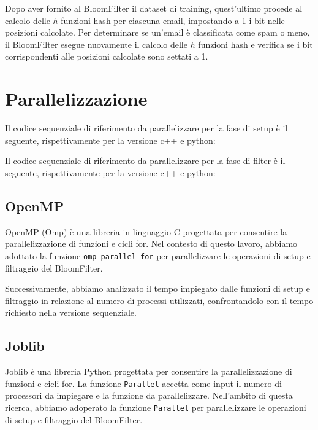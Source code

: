 \documentclass[11pt]{article}
\begin{document}
    Dopo aver fornito al BloomFilter il dataset di training, quest'ultimo procede al calcolo delle $h$ funzioni hash per ciascuna email,
    impostando a 1 i bit nelle posizioni calcolate.
    Per determinare se un'email è classificata come spam o meno, il BloomFilter esegue nuovamente il calcolo delle $h$
    funzioni hash e verifica se i bit corrispondenti alle posizioni calcolate sono settati a 1.

    \section{Parallelizzazione}\label{sec:parallelizazzione}
    Il codice sequenziale di riferimento da parallelizzare per la fase di setup è il seguente, rispettivamente per la versione c++ e python:
    
    

    Il codice sequenziale di riferimento da parallelizzare per la fase di filter è il seguente, rispettivamente per la versione c++ e python:
    
    

    \subsection{OpenMP}\label{subsec:omp}
    OpenMP (Omp) è una libreria in linguaggio C progettata per consentire la parallelizzazione di funzioni e cicli for.
    Nel contesto di questo lavoro, abbiamo adottato la funzione \texttt{omp parallel for} per parallelizzare le operazioni
    di setup e filtraggio del BloomFilter.

    Successivamente, abbiamo analizzato il tempo impiegato dalle funzioni di setup e filtraggio in relazione al numero
    di processi utilizzati, confrontandolo con il tempo richiesto nella versione sequenziale.
    
    

    \subsection{Joblib}\label{subsec:joblib}
    Joblib è una libreria Python progettata per consentire la parallelizzazione di funzioni e cicli for.
    La funzione \texttt{Parallel} accetta come input il numero di processori da impiegare e la funzione da parallelizzare.
    Nell'ambito di questa ricerca, abbiamo adoperato la funzione \texttt{Parallel} per parallelizzare le operazioni di setup
    e filtraggio del BloomFilter.
\end{document}
